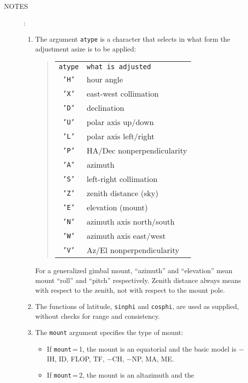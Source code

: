\documentclass[12pt,fleqn,twoside]{article}
\renewcommand{\_}{{\tt\char'137}}     %
\newcommand{\notes}[1]
{
  \goodbreak
  \begin{description}
    \item[NOTES]: \nopagebreak
        #1
  \end{description}
  \vspace{-3ex}
}
\begin{document}
\notes{
\begin{enumerate}
\setlength{\parskip}{\medskipamount}
\item The argument {\tt atype} is a character that selects in what form the
      adjustment asize is to be applied: \\
   \vspace{0.4ex}
   \begin{quote}
   \begin{tabular}{cl}
     {\tt atype} & {\tt what is adjusted} \\ [0.5ex]
     {\tt 'H'} & hour angle \\
     {\tt 'X'} & east-west collimation \\
     {\tt 'D'} & declination \\
     {\tt 'U'} & polar axis up/down \\
     {\tt 'L'} & polar axis left/right \\
     {\tt 'P'} & HA/Dec nonperpendicularity \\
     {\tt 'A'} & azimuth \\
     {\tt 'S'} & left-right collimation \\
     {\tt 'Z'} & zenith distance (sky) \\
     {\tt 'E'} & elevation (mount) \\
     {\tt 'N'} & azimuth axis north/south \\
     {\tt 'W'} & azimuth axis east/west \\
     {\tt 'V'} & Az/El nonperpendicularity \\
   \end{tabular}
   \end{quote}
   \vspace{1ex}
      For a generalized gimbal mount, ``azimuth'' and ``elevation''
      mean mount ``roll'' and ``pitch'' respectively.  Zenith distance
      always means with respect to the zenith, not with respect to
      the mount pole.
\item The functions of latitude, {\tt sinphi} and {\tt cosphi}, are used as
      supplied, without checks for range and consistency.
\item The {\tt mount} argument specifies the type of mount:
      \begin{itemize}
      \item If {\tt mount}\,=\,1, the mount is an equatorial and the
            basic model is $-$IH, ID, FLOP, TF, $-$CH, $-$NP, MA, ME.
      \item If {\tt mount}\,=\,2, the mount is an altazimuth and the

\end{itemize}
\end{enumerate}}
\end{document}
